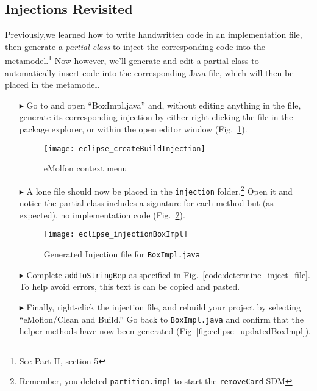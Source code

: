 \subsection{Injections Revisited}
\genHeader

Previously,we learned how to write handwritten code in an implementation file, then generate a \emph{partial class} to inject the corresponding code into the
metamodel.\footnote{See Part II, section 5} Now however, we'll generate and edit a partial class to automatically insert code into the corresponding Java file,
which will then be placed in the metamodel.

\begin{itemize}

\item[$\blacktriangleright$] Go to and open ``BoxImpl.java'' and, without editing anything in the file, generate its corresponding injection by
either right-clicking the file in the package explorer, or within the open editor window (Fig.~\ref{fig:createInjection}).

\vspace{0.5cm}

\begin{figure}[htbp]
    \centering
    \texttt{[image: eclipse\_createBuildInjection]}
    \caption{eMolfon context menu}
    \label{fig:createInjection}
\end{figure}

\clearpage

\item[$\blacktriangleright$] A lone file should now be placed in the \texttt{injection} folder.\footnote{Remember, you deleted \texttt{partition.impl} to start
the \texttt{removeCard} SDM} Open it and notice the partial class includes a signature for each method but (as expected), no implementation code
(Fig.~\ref{fig:injection_partialClassBox}).

\begin{figure}[htbp]
    \centering
    \texttt{[image: eclipse\_injectionBoxImpl]}
    \caption{Generated Injection file for \texttt{BoxImpl.java}}
    \label{fig:injection_partialClassBox}
\end{figure}

\item[$\blacktriangleright$] Complete \texttt{addToStringRep} as specified in Fig.~\ref{code:determine_inject_file}. To help avoid errors, this text is can be
copied and pasted.

\item[$\blacktriangleright$] Finally, right-click the injection file, and rebuild your project by selecting ``eMoflon/Clean and Build.'' Go back to
\texttt{BoxImpl.java} and confirm that the helper methods have now been generated (Fig~\ref{fig:eclipse_updatedBoxImpl}).


\end{itemize}
